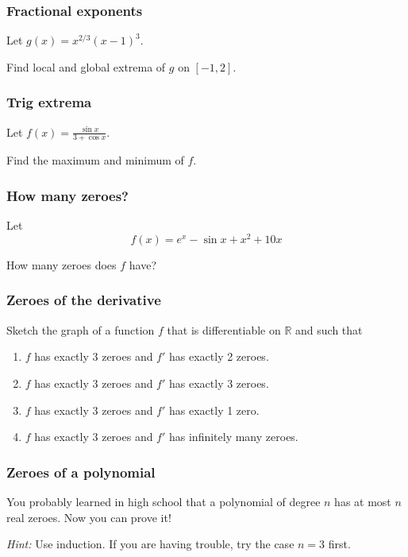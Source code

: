 \documentclass[14pt]{beamer}
\begin{document}
\begin{frame}[t]
	\frametitle{Fractional exponents}

	Let $\displaystyle g(x) = x^{2/3}(x-1)^{3}.$

	Find local and global extrema of $g$ on $\displaystyle [-1,2]$.
\end{frame}

\begin{frame}[t]
	\frametitle{Trig extrema}

	Let $\displaystyle f(x) = \frac{\sin x}{3 + \cos x}.$

	Find the maximum and minimum of $f$.
\end{frame}

\begin{frame}[t]
	\frametitle{How many zeroes?}

	Let
	\[
		f(x) = e^{x}- \sin x + x^{2}+ 10x
	\]

	How many zeroes does $f$ have?
\end{frame}

\begin{frame}[t]
	\frametitle{Zeroes of the derivative}

	Sketch the graph of a function $f$ that is differentiable on $\mathbb{R}$ and
	such that

	\begin{enumerate}
		\item $f$ has exactly 3 zeroes and $f'$ has exactly 2 zeroes.

		\item $f$ has exactly 3 zeroes and $f'$ has exactly 3 zeroes.

		\item $f$ has exactly 3 zeroes and $f'$ has exactly 1 zero.

		\item $f$ has exactly 3 zeroes and $f'$ has infinitely many zeroes.
	\end{enumerate}
\end{frame}

\begin{frame}[t]
	\frametitle{Zeroes of a polynomial}

	You probably learned in high school that a polynomial of degree $n$ has at
	most $n$ real zeroes. Now you can prove it!

	\emph{Hint:} Use induction. If you are having trouble, try the case $n=3$
	first.
\end{frame}
\end{document}

